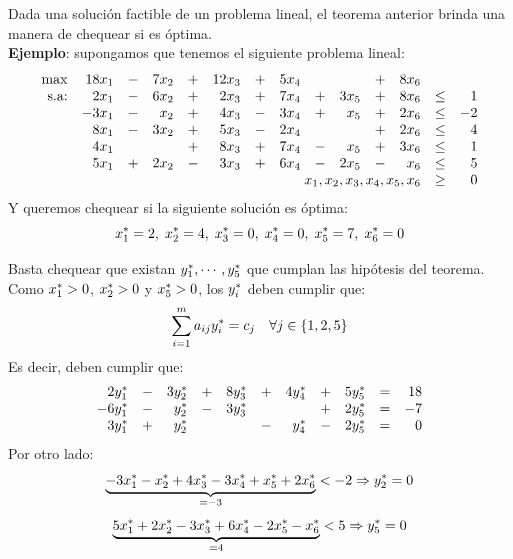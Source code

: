 \documentclass[10pt, aspectratio=169,usenames,dvipsnames]{beamer}
\begin{document}
\begin{frame}{}
    Dada una solución factible de un problema lineal, el teorema anterior brinda una manera de chequear si es óptima. \\
    \textbf{Ejemplo}: supongamos que tenemos el siguiente problema lineal:
    \[\begin{array}{rrrrrrrrrrrrrr}
        \max & 18x_1 & - & 7x_2 & + & 12x_3 & + & 5x_4 & & & + & 8x_6 \\
        \text{s.a:} & 2x_1 & - & 6x_2& + & 2x_3 & + & 7x_4& + & 3x_5& + & 8x_6 &\leq & 1 \\ 
        & -3x_1 & - & x_2& + & 4x_3 & - & 3x_4& + & x_5& + & 2x_6 &\leq & -2 \\ 
        & 8x_1 & - & 3x_2& + & 5x_3 & - & 2x_4&  & & + & 2x_6 &\leq & 4 \\ 
        & 4x_1 &  & & + & 8x_3 & + & 7x_4& - & x_5& + & 3x_6 &\leq & 1 \\ 
        & 5x_1 & + & 2x_2& - & 3x_3 & + & 6x_4& - & 2x_5& - & x_6 &\leq & 5 \\
        & \multicolumn{11}{r}{x_1,x_2,x_3,x_4,x_5,x_6} & \geq & 0
    \end{array}
    \]
    Y queremos chequear si la siguiente solución es óptima:
    \[x^{\ast}_1=2, \; x^{\ast}_2=4, \; x^{\ast}_3=0, \; x^{\ast}_4=0, \; x^{\ast}_5=7, \; x^{\ast}_6=0 \]
\end{frame}

\begin{frame}{}
    Basta chequear que existan $y^{\ast}_1,\cdots, y^{\ast}_5$ que cumplan las hipótesis del teorema.
    Como $x^{\ast}_1> 0$, $x^{\ast}_2> 0$ y $x^{\ast}_5> 0$, los $y^{\ast}_i$ deben cumplir que:
    \[        \displaystyle \sum_{i=1}^m a_{ij}y^{\ast}_i = c_j \quad \forall j\in\{1,2,5\} \]
    Es decir, deben cumplir que:
    \[\begin{array}{rrrrrrrrrrr}
        2y^{\ast}_1 & - & 3y^{\ast}_2 & + & 8y^{\ast}_3 & + &4y^{\ast}_4& + &5y^{\ast}_5& = & 18\\
        -6y^{\ast}_1 & - & y^{\ast}_2 & - & 3y^{\ast}_3 & & & + &2y^{\ast}_5& = & -7\\
        3y^{\ast}_1 & + & y^{\ast}_2 &  &   & - & y^{\ast}_4 & - &2y^{\ast}_5& = & 0\\
    \end{array}
    \]
    Por otro lado:
    \[ \underbrace{-3x^{\ast}_1  -  x^{\ast}_2 + 4x^{\ast}_3 - 3x^{\ast}_4 +  x^{\ast}_5 + 2x^{\ast}_6}_{=-3} < -2 \Rightarrow y^{\ast}_2=0\]
    \[\underbrace{5x^{\ast}_1 + 2x^{\ast}_2 - 3x^{\ast}_3 + 6x^{\ast}_4 -  2x^{\ast}_5 - x^{\ast}_6}_{=4} < 5 \Rightarrow y^{\ast}_5=0    \]
\end{frame}
\end{document}
